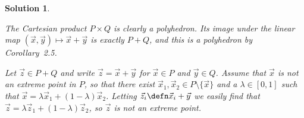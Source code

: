 \documentclass[article, a4paper, 11pt, oneside]{memoir}
\numberwithin{equation}{chapter}
\theoremstyle{nonumberplain}
\newtheorem{solution}{Solution}
\begin{document}
\begin{solution}
\begin{solutionsec}
    \item The Cartesian product $P \times Q$ is clearly a polyhedron. Its image under the linear map $(\vec{x}, \vec{y}) \mapsto \vec{x} + \vec{y}$ is exactly $P + Q$, and this is a polyhedron by Corollary~2.5.

    \item Let $\vec{z} \in P + Q$ and write $\vec{z} = \vec{x} + \vec{y}$ for $\vec{x} \in P$ and $\vec{y} \in Q$. Assume that $\vec{x}$ is not an extreme point in $P$, so that there exist $\vec{x}_1, \vec{x}_2 \in P \setminus \{\vec{x}\}$ and a $\lambda \in [0,1]$ such that $\vec{x} = \lambda \vec{x}_1 + (1-\lambda) \vec{x}_2$. Letting $\vec{z}_i \defn \vec{x}_i + \vec{y}$ we easily find that $\vec{z} = \lambda \vec{z}_1 + (1-\lambda) \vec{z}_2$, so $\vec{z}$ is not an extreme point.
\end{solutionsec}
\end{solution}
\end{document}
